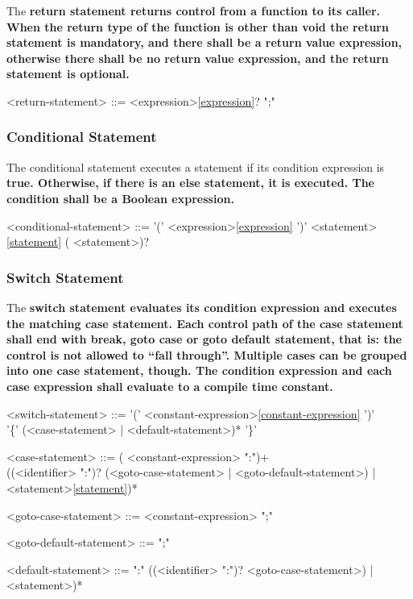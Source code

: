 \documentclass[a4paper,oneside,11pt]{article}
\begin{document}
The \bf{return} statement returns control from a function to its caller.
When the return type of the function is other than \bf{void}
the return statement is mandatory, and
there shall be a return value expression,
otherwise there shall be no return value expression,
and the return statement is optional.

\begin{grammar}
\label{return-statement}<return-statement> ::=  <expression>\ref{expression}? ";"
\end{grammar}

\subsubsection{Conditional Statement}

The conditional statement executes a statement if its condition expression is \bf{true}.
Otherwise, if there is an else statement, it is executed.
The condition shall be a Boolean expression.

\begin{grammar}
\label{conditional-statement}<conditional-statement> ::=  '(' <expression>\ref{expression} ')' <statement>\ref{statement} ( <statement>)?
\end{grammar}

\subsubsection{Switch Statement}

The \bf{switch} statement evaluates its condition expression
and executes the matching case statement.
Each control path of the \bf{case} statement shall
end with \bf{break}, \bf{goto case} or \bf{goto default} statement,
that is: the control is not allowed to ``fall through''.
Multiple cases can be grouped into one \bf{case} statement, though.
The condition expression and each case expression shall evaluate to a compile time constant.

\begin{grammar}
\label{switch-statement}<switch-statement> ::=  '(' <constant-expression>\ref{constant-expression} ')'\\
'\{' (<case-statement> | <default-statement>)* '\}'

<case-statement> ::= ( <constant-expression> ":")+\\
((<identifier> ":")? (<goto-case-statement> | <goto-default-statement>) | <statement>\ref{statement})*

<goto-case-statement> ::=   <constant-expression> ";"

<goto-default-statement> ::=   ";"

<default-statement> ::=  ":" ((<identifier> ":")? <goto-case-statement>) | <statement>)*

\end{grammar}
\end{document}
